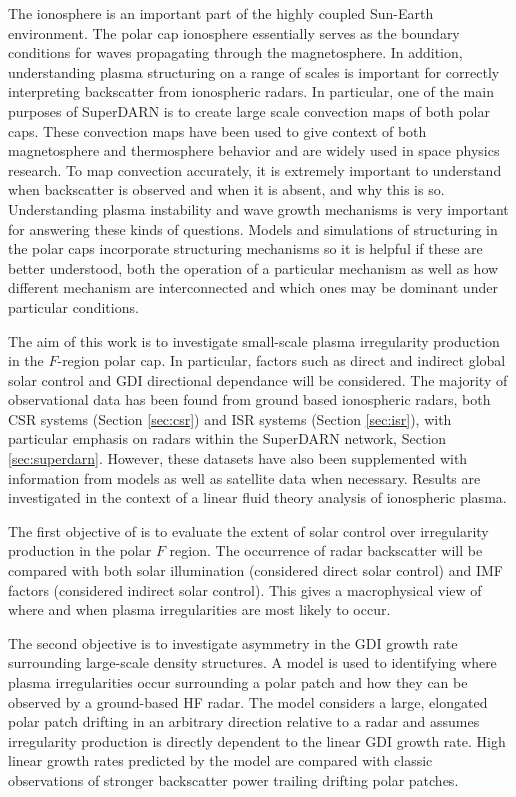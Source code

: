 The ionosphere is an important part of the highly coupled Sun-Earth environment.  The polar cap ionosphere essentially serves as the boundary conditions for waves propagating through the magnetosphere.  In addition, understanding plasma structuring on a range of scales is important for correctly interpreting backscatter from ionospheric radars.  In particular, one of the main purposes of SuperDARN is to create large scale convection maps of both polar caps.  These convection maps have been used to give context of both magnetosphere and thermosphere behavior and are widely used in space physics research.  To map convection accurately, it is extremely important to understand when backscatter is observed and when it is absent, and why this is so.  Understanding plasma instability and wave growth mechanisms is very important for answering these kinds of questions.  Models and simulations of structuring in the polar caps incorporate structuring mechanisms so it is helpful if these are better understood, both the operation of a particular mechanism as well as how different mechanism are interconnected and which ones may be dominant under particular conditions.

The aim of this work is to investigate small-scale plasma irregularity production in the \(F\)-region polar cap.  In particular, factors such as direct and indirect global solar control and GDI directional dependance will be considered.  The majority of observational data has been found from ground based ionospheric radars, both CSR systems (Section \ref{sec:csr}) and ISR systems (Section \ref{sec:isr}), with particular emphasis on radars within the SuperDARN network, Section \ref{sec:superdarn}.  However, these datasets have also been supplemented with information from models as well as satellite data when necessary.  Results are investigated in the context of a linear fluid theory analysis of ionospheric plasma.

The first objective of is to evaluate the extent of solar control over irregularity production in the polar \(F\) region.  The occurrence of radar backscatter will be compared with both solar illumination (considered direct solar control) and IMF factors (considered indirect solar control).  This gives a macrophysical view of where and when plasma irregularities are most likely to occur.

The second objective is to investigate asymmetry in the GDI growth rate surrounding large-scale density structures.  A model is used to identifying where plasma irregularities occur surrounding a polar patch and how they can be observed by a ground-based HF radar.  The model considers a large, elongated polar patch drifting in an arbitrary direction relative to a radar and assumes irregularity production is directly dependent to the linear GDI growth rate.  High linear growth rates predicted by the model are compared with classic observations of stronger backscatter power trailing drifting polar patches.

